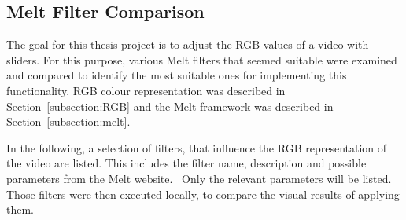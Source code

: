 \documentclass[../MasterThesis.tex]{subfiles}
\begin{document}
\newpage
\subsection{Melt Filter Comparison} \label{subsection:meltfilter}



The goal for this thesis project is to adjust the RGB values of a video with sliders. For this purpose, various Melt filters that seemed suitable were examined and compared to identify the most suitable ones for implementing this functionality. RGB colour representation was described in Section~\ref{subsection:RGB} and the Melt framework was described in Section~\ref{subsection:melt}.

In the following, a selection of filters, that influence the RGB representation of the video are listed. This includes the filter name, description and possible parameters from the Melt website.~\cite{melt_filters} Only the relevant parameters will be listed.
Those filters were then executed locally, to compare the visual results of applying them.
\end{document}
